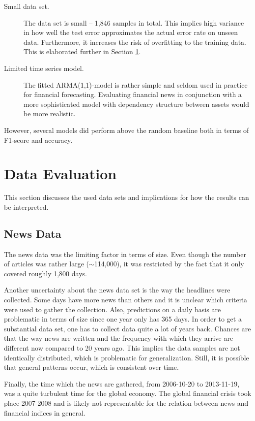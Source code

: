 \begin{description}
    \item[Small data set.] The data set is small -- 1,846 samples in total. This implies high variance in how well the test error approximates the actual error rate on unseen data. Furthermore, it increases the risk of overfitting to the training data. This is elaborated further in Section \ref{sec:disc_data}.
    \item[Limited time series model.] The fitted ARMA(1,1)-model is rather simple and seldom used in practice for financial forecasting. Evaluating financial news in conjunction with a more sophisticated model with dependency structure between assets would be more realistic. 
\end{description}

However, several models did perform above the random baseline both in terms of F1-score and accuracy. 



\section{Data Evaluation}\label{sec:disc_data}
This section discusses the used data sets and implications for how the results can be interpreted. 

\subsection{News Data}\label{sec:news_disc}

The news data was the limiting factor in terms of size. Even though the number of articles was rather large ($\sim$114,000), it was restricted by the fact that it only covered roughly 1,800 days.

Another uncertainty about the news data set is the way the headlines were collected. Some days have more news than others and it is unclear which criteria were used to gather the collection. Also, predictions on a daily basis are problematic in terms of size since one year only has 365 days. In order to get a substantial data set, one has to collect data quite a lot of years back. Chances are that the way news are written and the frequency with which they arrive are different now compared to 20 years ago. This implies the data samples are not identically distributed, which is problematic for generalization. Still, it is possible that general patterns occur, which is consistent over time. 

Finally, the time which the news are gathered, from 2006-10-20 to 2013-11-19, was a quite turbulent time for the global economy. The global financial crisis took place 2007-2008 and is likely not representable for the relation between news and financial indices in general. 

